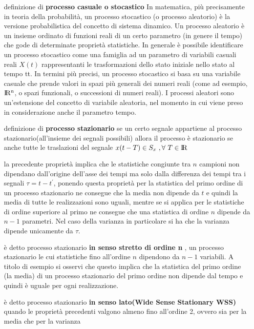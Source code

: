\documentclass{article}
\begin{document}
definizione di \textbf{processo casuale o stocastico}
In matematica, più precisamente in teoria della probabilità, un processo stocastico (o processo aleatorio) è la versione probabilistica del concetto di sistema dinamico. Un processo aleatorio è un insieme ordinato di funzioni reali di un certo parametro (in genere il tempo) che gode di determinate proprietà statistiche. In generale è possibile identificare un processo stocastico come una famiglia ad un parametro di variabili casuali reali
$X(t)$ rappresentanti le trasformazioni dello stato iniziale nello stato al tempo tt. In termini più precisi, un processo stocastico si basa su una variabile casuale che prende valori in spazi più generali dei numeri reali (come ad esempio,
$\rm I\!R ^n$, o spazi funzionali, o successioni di numeri reali). I processi aleatori sono un'estensione del concetto di variabile aleatoria, nel momento in cui viene preso in considerazione anche il parametro tempo.


definizione di \textbf{processo stazionario}
se un certo segnale appartiene al processo stazionario(all'insieme dei segnali possibili)
allora il processo è stazionario se anche tutte le traslazioni del segnale $x(t -T) \in S_x \ , \forall \ T \in \rm I\!R $

la precedente proprietà implica che le statistiche congiunte tra $n$ campioni non dipendano
dall'origine dell'asse dei tempi ma solo dalla differenza dei tempi tra i segnali $\tau = t-t^'$,
ponendo questa proprietà per la statistica del primo ordine di un processo stazionario
ne consegue che la media non dipende da $t$ e quindi la media di tutte le realizzazioni
sono uguali, mentre se si applica per le statistiche di ordine superiore al primo ne
consegue che una statistica di ordine $n$ dipende da $n-1$ parametri.
Nel caso della varianza in particolare si ha che la varianza dipende unicamente da $\tau$.

è detto processo stazionario \textbf{in senso stretto di ordine n}
, un processo stazionario le cui statistiche fino all'ordine $n$ dipendono
da $n-1$ variabili. A titolo di esempio si osservi che questo implica che
la statistica del primo ordine (la media) di un processo stazionario del
primo ordine non dipende dal tempo e quindi è uguale per ogni realizzazione.

è detto processo stazionario \textbf{in senso lato(Wide Sense Stationary WSS)} quando
le proprietà precedenti valgono almeno fino all'ordine 2, ovvero sia per la media
che per la varianza
\end{document}
